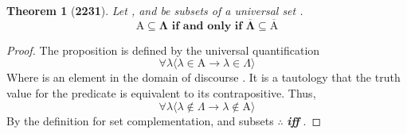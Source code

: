 \documentclass[preview]{standalone}
\newtheorem{theorem}{Theorem}
\begin{document}
\begin{theorem}[\textbf{2231}]
    Let , and \bm{$\Lambda$} be subsets of a universal set \bm{$\Omega$}. 
    \begin{equation*}
        \bm{
            \mathrm{A} \subseteq \Lambda
                \text{ if and only if } 
            \overline{\Lambda} \subseteq \overline{\mathrm{A}}
            }
    \end{equation*}
\end{theorem}
\begin{proof}
    The proposition  is defined by the universal quantification%
    \begin{equation*}
        \forall \lambda \Big \langle \lambda \in \mathrm{A} \rightarrow \lambda \in \Lambda \Big \rangle
    \end{equation*}
    Where \bm{$\lambda$} is an element in the domain of discourse \bm{$\Omega$}.
    It is a tautology that the truth value for the predicate is equivalent to its contrapositive. 
    Thus,  
    \begin{equation*}
        \forall \lambda \Big \langle \lambda \notin \Lambda \rightarrow \lambda \notin \mathrm{A} \Big \rangle
    \end{equation*} 
    By the definition for set complementation, and subsets
    $\therefore$  \textbf{\emph{ iff }} .
\end{proof}
\end{document}
